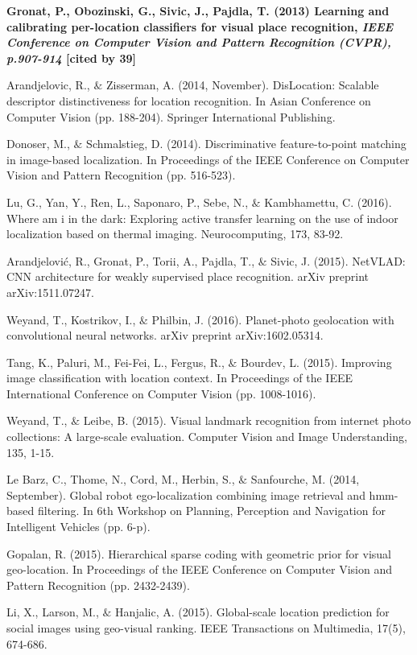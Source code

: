 
\noindent
\textbf{	
	Gronat, P., Obozinski, G., Sivic, J., Pajdla, T. (2013)
	Learning and calibrating per-location classifiers for visual place recognition,  
	\textit{IEEE Conference on Computer Vision and Pattern Recognition (CVPR), p.907-914}
	[cited by 39]
}


\noindent
Arandjelovic, R., $\&$ Zisserman, A. (2014, November). DisLocation: Scalable descriptor distinctiveness for location recognition. In Asian Conference on Computer Vision (pp. 188-204). Springer International Publishing.


\noindent
Donoser, M., $\&$ Schmalstieg, D. (2014). Discriminative feature-to-point matching in image-based localization. In Proceedings of the IEEE Conference on Computer Vision and Pattern Recognition (pp. 516-523).

\noindent
Lu, G., Yan, Y., Ren, L., Saponaro, P., Sebe, N., $\&$ Kambhamettu, C. (2016). Where am i in the dark: Exploring active transfer learning on the use of indoor localization based on thermal imaging. Neurocomputing, 173, 83-92.

\noindent
Arandjelović, R., Gronat, P., Torii, A., Pajdla, T., $\&$ Sivic, J. (2015). NetVLAD: CNN architecture for weakly supervised place recognition. arXiv preprint arXiv:1511.07247.

\noindent
Weyand, T., Kostrikov, I., $\&$ Philbin, J. (2016). Planet-photo geolocation with convolutional neural networks. arXiv preprint arXiv:1602.05314.

\noindent
Tang, K., Paluri, M., Fei-Fei, L., Fergus, R., $\&$ Bourdev, L. (2015). Improving image classification with location context. In Proceedings of the IEEE International Conference on Computer Vision (pp. 1008-1016).

\noindent
Weyand, T., $\&$ Leibe, B. (2015). Visual landmark recognition from internet photo collections: A large-scale evaluation. Computer Vision and Image Understanding, 135, 1-15.

\noindent
Le Barz, C., Thome, N., Cord, M., Herbin, S., $\&$ Sanfourche, M. (2014, September). Global robot ego-localization combining image retrieval and hmm-based filtering. In 6th Workshop on Planning, Perception and Navigation for Intelligent Vehicles (pp. 6-p).

\noindent
Gopalan, R. (2015). Hierarchical sparse coding with geometric prior for visual geo-location. In Proceedings of the IEEE Conference on Computer Vision and Pattern Recognition (pp. 2432-2439).

\noindent
Li, X., Larson, M., $\&$ Hanjalic, A. (2015). Global-scale location prediction for social images using geo-visual ranking. IEEE Transactions on Multimedia, 17(5), 674-686.


